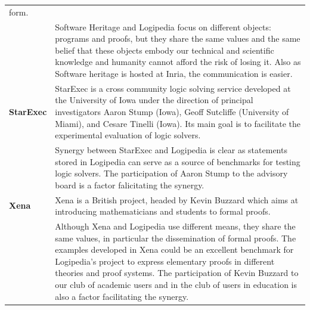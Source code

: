 \begin{longtable}{|p{}|p{}|}
form.\\
&
\hspace{0.4cm} Software Heritage and Logipedia focus on different
objects: programs and proofs, but they share the same values and the
same belief that these objects embody our technical and scientific
knowledge and humanity cannot afford the risk of losing it. Also as
Software heritage is hosted at Inria, the communication is easier.
\\
\hline
    {\bf StarExec} &
     StarExec is a cross community logic solving service developed at the University of Iowa under the direction of principal investigators Aaron Stump (Iowa), Geoff Sutcliffe (University of Miami), and Cesare Tinelli (Iowa).
Its main goal is to facilitate the experimental evaluation of logic solvers.\\
&
\hspace{0.4cm}
Synergy between StarExec and Logipedia is clear as statements stored in Logipedia can serve as a source of benchmarks for testing logic solvers.
The participation of Aaron Stump to the advisory board is a factor falicitating the synergy.
\\
\hline  
{\bf Xena} 
&
Xena is a British project, headed by Kevin Buzzard 
which aims at
introducing mathematicians and students
to formal proofs.\\
&
\hspace{0.4cm} Although Xena and Logipedia use different means, they
share the same values, in particular the dissemination of formal
proofs. The examples developed in Xena could be an excellent benchmark
for Logipedia's project to express elementary proofs in different
theories and proof systems.  The participation of Kevin Buzzard to our
club of academic users and in the club of users in education is also a
factor facilitating the synergy.\\ \hline
\end{longtable}

